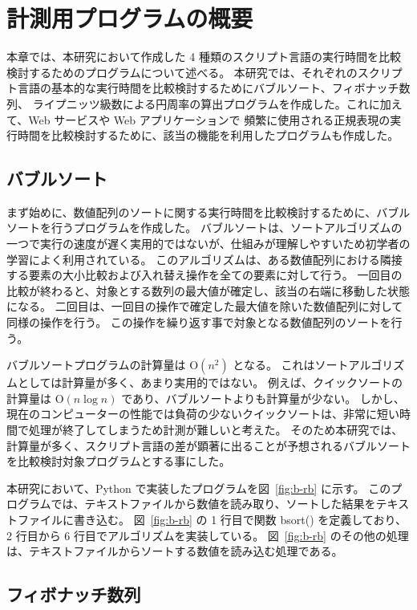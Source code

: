 \chapter{計測用プログラムの概要}
\label{cha:program}

本章では、本研究において作成した 4 種類のスクリプト言語の実行時間を比較検討するためのプログラムについて述べる。 
本研究では、それぞれのスクリプト言語の基本的な実行時間を比較検討するためにバブルソート、フィボナッチ数列、
ライプニッツ級数による円周率の算出プログラムを作成した。これに加えて、Web サービスや Web アプリケーションで
頻繁に使用される正規表現の実行時間を比較検討するために、該当の機能を利用したプログラムも作成した。

\section{バブルソート}
\label{cha:program:sort}

まず始めに、数値配列のソートに関する実行時間を比較検討するために、バブルソートを行うプログラムを作成した。
バブルソートは、ソートアルゴリズムの一つで実行の速度が遅く実用的ではないが、仕組みが理解しやすいため初学者の学習によく利用されている。
このアルゴリズムは、ある数値配列における隣接する要素の大小比較および入れ替え操作を全ての要素に対して行う。
一回目の比較が終わると、対象とする数列の最大値が確定し、該当の右端に移動した状態になる。
二回目は、一回目の操作で確定した最大値を除いた数値配列に対して同様の操作を行う。
この操作を繰り返す事で対象となる数値配列のソートを行う。

バブルソートプログラムの計算量は O$(n^{2})$ となる。
これはソートアルゴリズムとしては計算量が多く、あまり実用的ではない。
例えば、クイックソートの計算量は O$(n\log{n})$ であり、バブルソートよりも計算量が少ない。
しかし、現在のコンピューターの性能では負荷の少ないクイックソートは、非常に短い時間で処理が終了してしまうため計測が難しいと考えた。
そのため本研究では、計算量が多く、スクリプト言語の差が顕著に出ることが予想されるバブルソートを比較検討対象プログラムとする事にした。

本研究において、Python で実装したプログラムを図~\ref{fig:b-rb} に示す。
このプログラムでは、テキストファイルから数値を読み取り、ソートした結果をテキストファイルに書き込む。
図~\ref{fig:b-rb} の 1 行目で関数 bsort() を定義しており、2 行目から 6 行目でアルゴリズムを実装している。
図~\ref{fig:b-rb} のその他の処理は、テキストファイルからソートする数値を読み込む処理である。

\section{フィボナッチ数列}
\label{cha:program:fibonacci}

